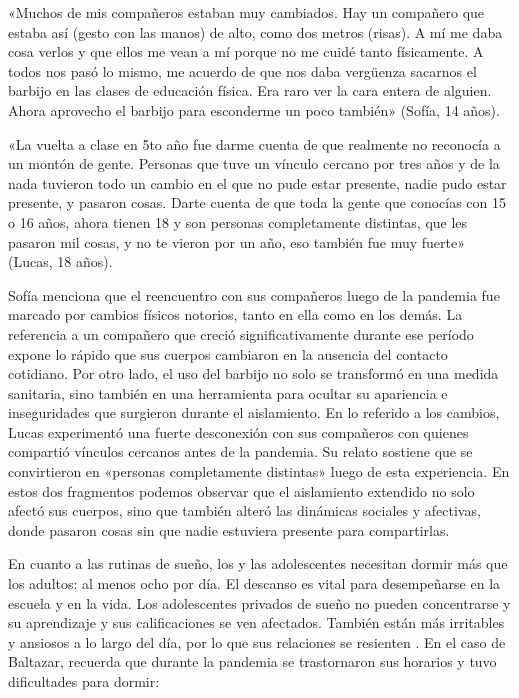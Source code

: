 \begin{refsection}
\begin{gbcita}
«Muchos de mis compañeros estaban muy cambiados. Hay un compañero que estaba así (gesto con las manos) de alto, como dos metros (risas). A mí me daba cosa verlos y que ellos me vean a mí porque no me cuidé tanto físicamente. A todos nos pasó lo mismo, me acuerdo de que nos daba vergüenza sacarnos el barbijo en las clases de educación física. Era raro ver la cara entera de alguien. Ahora aprovecho el barbijo para esconderme un poco también» (Sofía, 14 años).

«La vuelta a clase en 5to año fue darme cuenta de que realmente no reconocía a un montón de gente. Personas que tuve un vínculo cercano por tres años y de la nada tuvieron todo un cambio en el que no pude estar presente, nadie pudo estar presente, y pasaron cosas. Darte cuenta de que toda la gente que conocías con 15 o 16 años, ahora tienen 18 y son personas completamente distintas, que les pasaron mil cosas, y no te vieron por un año, eso también fue muy fuerte» (Lucas, 18 años).

\end{gbcita}

Sofía menciona que el reencuentro con sus compañeros luego de la pandemia fue marcado por cambios físicos notorios, tanto en ella como en los demás. La referencia a un compañero que creció significativamente durante ese período expone lo rápido que sus cuerpos cambiaron en la ausencia del contacto cotidiano. Por otro lado, el uso del barbijo no solo se transformó en una medida sanitaria, sino también en una herramienta para ocultar su apariencia e inseguridades que surgieron durante el aislamiento. En lo referido a los cambios, Lucas experimentó una fuerte desconexión con sus compañeros con quienes compartió vínculos cercanos antes de la pandemia. Su relato sostiene que se convirtieron en «personas completamente distintas» luego de esta experiencia. En estos dos fragmentos podemos observar que el aislamiento extendido no solo afectó sus cuerpos, sino que también alteró las dinámicas sociales y afectivas, donde pasaron cosas sin que nadie estuviera presente para compartirlas.

En cuanto a las rutinas de sueño, los y las adolescentes necesitan dormir más que los adultos: al menos ocho por día. El descanso es vital para desempeñarse en la escuela y en la vida. Los adolescentes privados de sueño no pueden concentrarse y su aprendizaje y sus calificaciones se ven afectados. También están más irritables y ansiosos a lo largo del día, por lo que sus relaciones se resienten \protect\parencite{4200-HAIDT2024}. En el caso de Baltazar, recuerda que durante la pandemia se trastornaron sus horarios y tuvo dificultades para dormir:



\end{refsection}
